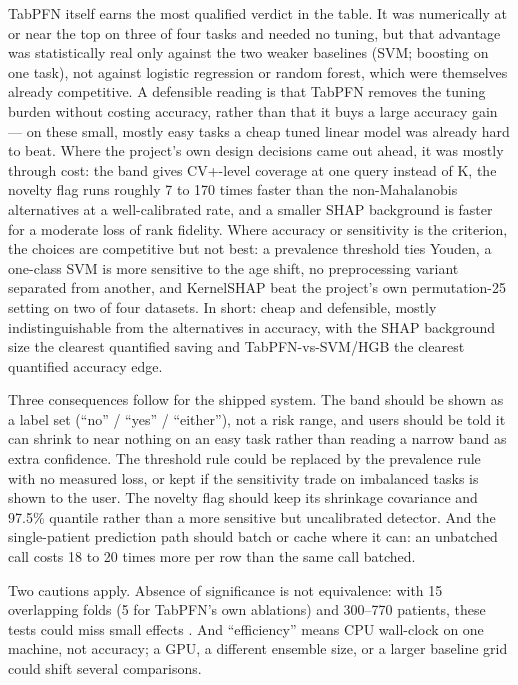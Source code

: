 \documentclass[conference]{IEEEtran}
\begin{document}
TabPFN itself earns the most qualified verdict in the table. It was numerically at or near the top on three of four tasks and needed no tuning, but that advantage was statistically real only against the two weaker baselines (SVM; boosting on one task), not against logistic regression or random forest, which were themselves already competitive. A defensible reading is that TabPFN removes the tuning burden without costing accuracy, rather than that it buys a large accuracy gain --- on these small, mostly easy tasks a cheap tuned linear model was already hard to beat. Where the project's own design decisions came out ahead, it was mostly through cost: the band gives CV+-level coverage at one query instead of K, the novelty flag runs roughly 7 to 170 times faster than the non-Mahalanobis alternatives at a well-calibrated rate, and a smaller SHAP background is faster for a moderate loss of rank fidelity. Where accuracy or sensitivity is the criterion, the choices are competitive but not best: a prevalence threshold ties Youden, a one-class SVM is more sensitive to the age shift, no preprocessing variant separated from another, and KernelSHAP beat the project's own permutation-25 setting on two of four datasets. In short: cheap and defensible, mostly indistinguishable from the alternatives in accuracy, with the SHAP background size the clearest quantified saving and TabPFN-vs-SVM/HGB the clearest quantified accuracy edge.

Three consequences follow for the shipped system. The band should be shown as a label set (``no'' / ``yes'' / ``either''), not a risk range, and users should be told it can shrink to near nothing on an easy task rather than reading a narrow band as extra confidence. The threshold rule could be replaced by the prevalence rule with no measured loss, or kept if the sensitivity trade on imbalanced tasks is shown to the user. The novelty flag should keep its shrinkage covariance and 97.5\% quantile rather than a more sensitive but uncalibrated detector. And the single-patient prediction path should batch or cache where it can: an unbatched call costs 18 to 20 times more per row than the same call batched.

Two cautions apply. Absence of significance is not equivalence: with 15 overlapping folds (5 for TabPFN's own ablations) and 300--770 patients, these tests could miss small effects \cite{varoquaux2018}. And ``efficiency'' means CPU wall-clock on one machine, not accuracy; a GPU, a different ensemble size, or a larger baseline grid could shift several comparisons.
\end{document}
